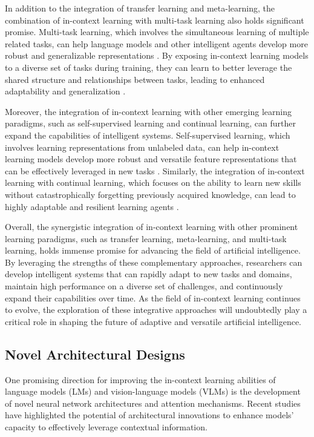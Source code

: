 \documentclass[11pt]{article}
\begin{document}
In addition to the integration of transfer learning and meta-learning, the combination of in-context learning with multi-task learning also holds significant promise. Multi-task learning, which involves the simultaneous learning of multiple related tasks, can help language models and other intelligent agents develop more robust and generalizable representations \cite{ref358,ref359}. By exposing in-context learning models to a diverse set of tasks during training, they can learn to better leverage the shared structure and relationships between tasks, leading to enhanced adaptability and generalization \cite{ref360}.

Moreover, the integration of in-context learning with other emerging learning paradigms, such as self-supervised learning and continual learning, can further expand the capabilities of intelligent systems. Self-supervised learning, which involves learning representations from unlabeled data, can help in-context learning models develop more robust and versatile feature representations that can be effectively leveraged in new tasks \cite{ref361}. Similarly, the integration of in-context learning with continual learning, which focuses on the ability to learn new skills without catastrophically forgetting previously acquired knowledge, can lead to highly adaptable and resilient learning agents \cite{ref362}.

Overall, the synergistic integration of in-context learning with other prominent learning paradigms, such as transfer learning, meta-learning, and multi-task learning, holds immense promise for advancing the field of artificial intelligence. By leveraging the strengths of these complementary approaches, researchers can develop intelligent systems that can rapidly adapt to new tasks and domains, maintain high performance on a diverse set of challenges, and continuously expand their capabilities over time. As the field of in-context learning continues to evolve, the exploration of these integrative approaches will undoubtedly play a critical role in shaping the future of adaptive and versatile artificial intelligence.

\subsection{Novel Architectural Designs}

One promising direction for improving the in-context learning abilities of language models (LMs) and vision-language models (VLMs) is the development of novel neural network architectures and attention mechanisms. Recent studies have highlighted the potential of architectural innovations to enhance models' capacity to effectively leverage contextual information.
\end{document}
